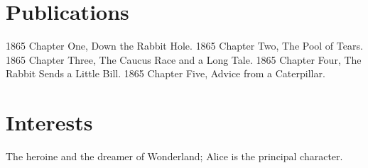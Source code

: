 \documentclass[letterpaper]{curriculum_vitae} %
\begin{document}


\newpage %
\makenextprofile %


\section{Publications}

\begin{twentyshort}
  \twentyitemshort
    {1865}
    {Chapter One, Down the Rabbit Hole.}
  \twentyitemshort
    {1865}
    {Chapter Two, The Pool of Tears.}
  \twentyitemshort
    {1865}
    {Chapter Three,  The Caucus Race and a Long Tale.}
  \twentyitemshort
    {1865}
    {Chapter Four,  The Rabbit Sends a Little Bill.}
  \twentyitemshort
    {1865}
    {Chapter Five,  Advice from a Caterpillar.}
\end{twentyshort}

\section{Interests}

The heroine and the dreamer of Wonderland;  Alice is the principal character.

\end{document}
